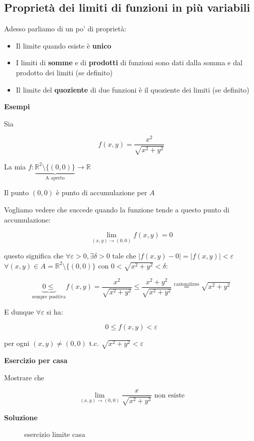 \documentclass[11pt]{article}
\begin{document}
\subsection{Proprietà dei limiti di funzioni in più variabili}

Adesso parliamo di un po' di proprietà:

\begin{itemize}
    \item Il limite quando esiste è \textbf{unico}
    \item I limiti di \textbf{somme} e di \textbf{prodotti} di funzioni sono dati dalla somma e dal prodotto dei limiti (se definito)
    \item Il limite del \textbf{quoziente} di due funzioni è il quoziente dei limiti (se definito)
\end{itemize}

\textbf{Esempi} 

Sia 

\[
    f(x,y) = \frac{x^{2}}{\sqrt{x^{2}+y^{2}}}
\]

La mia $f: \underbrace{\mathbb{R}^{2}\setminus \{(0,0)\}}_\text{A aperto}\rightarrow \mathbb{R}$

Il punto $(0,0)$ è punto di accumulazione per $A$ 

Vogliamo vedere che succede quando la funzione tende a questo punto di accumulazione:

\[
    \lim_{ (x,y) \to (0,0) } f(x,y) = 0
\]

questo significa che $\forall \varepsilon >0 , \exists \delta >0$ tale che $|f(x,y) -0| = |f(x,y)| <\varepsilon$ $\forall (x,y) \in A = \mathbb{R}^{2}\setminus \{(0,0)\}$ con $0< \sqrt{x^{2}+y^{2}}<\delta$:

\[
    \underbrace{0\le}_\text{sempre positiva} f(x,y) = \frac{x^{2}}{\sqrt{x^{2}+y^{2}}} \le \frac{x^{2}+y^{2}}{\sqrt{x^{2}+y^{2}}} \overset{\text{razionalizzo}}{=} \sqrt{x^{2}+y^{2}}
\]

E dunque  $\forall \varepsilon$ si ha:

\[
    0 \le f(x,y) < \varepsilon
\]

per ogni $(x,y) \neq (0,0)$ t.c. $\sqrt{x^{2}+y^{2}} < \varepsilon$


\textbf{Esercizio per casa}

Mostrare che 

\[
    \lim_{ (x,y) \to (0,0) } \frac{x}{\sqrt{x^{2}+y^{2}}} \text{ non esiste}
\] 

\textbf{Soluzione} 

\begin{figure}[ht]
    \centering
    \caption{esercizio limite casa}
    \label{fig:esercizio-limite-casa}
\end{figure}
\end{document}
